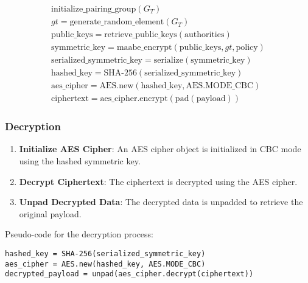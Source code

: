 \begin{align}
  \text{initialize\_pairing\_group}(G_T) \\
  gt = \text{generate\_random\_element}(G_T) \\
  \text{public\_keys} = \text{retrieve\_public\_keys}(\text{authorities}) \\
  \text{symmetric\_key} = \text{maabe\_encrypt}(\text{public\_keys}, gt, \text{policy}) \\
  \text{serialized\_symmetric\_key} = \text{serialize}(\text{symmetric\_key}) \\
  \text{hashed\_key} = \text{SHA-256}(\text{serialized\_symmetric\_key}) \\
  \text{aes\_cipher} = \text{AES.new}(\text{hashed\_key}, \text{AES.MODE\_CBC}) \\
  \text{ciphertext} = \text{aes\_cipher.encrypt}(\text{pad}(\text{payload}))
  \end{align}

\subsubsection{Decryption}

\begin{enumerate}
    \item \textbf{Initialize AES Cipher}: An AES cipher object is initialized in CBC mode using the hashed symmetric key.
    \item \textbf{Decrypt Ciphertext}: The ciphertext is decrypted using the AES cipher.
    \item \textbf{Unpad Decrypted Data}: The decrypted data is unpadded to retrieve the original payload.
\end{enumerate}

Pseudo-code for the decryption process:

\begin{verbatim}
hashed_key = SHA-256(serialized_symmetric_key)
aes_cipher = AES.new(hashed_key, AES.MODE_CBC)
decrypted_payload = unpad(aes_cipher.decrypt(ciphertext))
\end{verbatim}